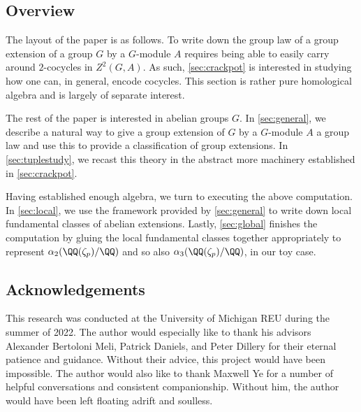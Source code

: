 \subsection{Overview}
The layout of the paper is as follows. To write down the group law of a group extension of a group $G$ by a $G$-module $A$ requires being able to easily carry around $2$-cocycles in $Z^2(G,A)$. As such, \autoref{sec:crackpot} is interested in studying how one can, in general, encode cocycles. This section is rather pure homological algebra and is largely of separate interest.

The rest of the paper is interested in abelian groups $G$. In \autoref{sec:general}, we describe a natural way to give a group extension of $G$ by a $G$-module $A$ a group law and use this to provide a classification of group extensions. In \autoref{sec:tuplestudy}, we recast this theory in the abstract more machinery established in \autoref{sec:crackpot}.

Having established enough algebra, we turn to executing the above computation. In \autoref{sec:local}, we use the framework provided by \autoref{sec:general} to write down local fundamental classes of abelian extensions. Lastly, \autoref{sec:global} finishes the computation by gluing the local fundamental classes together appropriately to represent $\alpha_2(\QQ(\zeta_p)/\QQ)$ and so also $\alpha_3(\QQ(\zeta_p)/\QQ)$, in our toy case.

\subsection{Acknowledgements}
This research was conducted at the University of Michigan REU during the summer of 2022. The author would especially like to thank his advisors Alexander Bertoloni Meli, Patrick Daniels, and Peter Dillery for their eternal patience and guidance. Without their advice, this project would have been impossible. The author would also like to thank Maxwell Ye for a number of helpful conversations and consistent companionship. Without him, the author would have been left floating adrift and soulless.